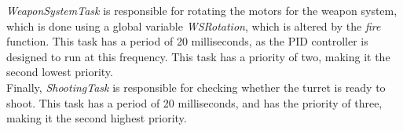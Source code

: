 \emph{WeaponSystemTask} is responsible for rotating the motors for the weapon system, which is done using a global variable \emph{WSRotation}, which is altered by the \emph{fire} function. This task has a period of 20 milliseconds, as the PID controller is designed to run at this frequency. This task has a priority of two, making it the second lowest priority. \\

Finally, \emph{ShootingTask} is responsible for checking whether the turret is ready to shoot. This task has a period of 20 milliseconds, and has the priority of three, making it the second highest priority.

